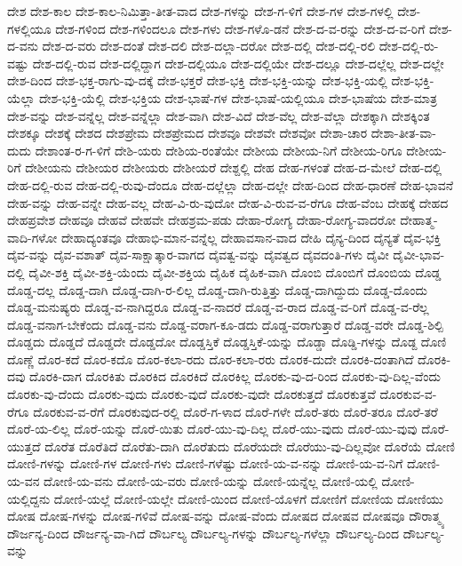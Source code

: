 {ದೇಶ
ದೇಶ-ಕಾಲ
ದೇಶ-ಕಾಲ-ನಿಮಿತ್ತಾ-ತೀತ-ವಾದ
ದೇಶ-ಗಳನ್ನು
ದೇಶ-ಗ-ಳಿಗೆ
ದೇಶ-ಗಳ
ದೇಶ-ಗಳಲ್ಲಿ
ದೇಶ-ಗಳಲ್ಲಿಯೂ
ದೇಶ-ಗಳಿಂದ
ದೇಶ-ಗಳಿಂದಲೂ
ದೇಶ-ಗಳು
ದೇಶ-ಗಳೊ-ಡನೆ
ದೇಶ-ದ-ವ-ರನ್ನು
ದೇಶ-ದ-ವ-ರಿಗೆ
ದೇಶ-ದ-ವನು
ದೇಶ-ದ-ವರು
ದೇಶ-ದಂತೆ
ದೇಶ-ದಲಿ
ದೇಶ-ದಲ್ಲಾ-ದರೋ
ದೇಶ-ದಲ್ಲಿ
ದೇಶ-ದಲ್ಲಿ-ರಲಿ
ದೇಶ-ದಲ್ಲಿ-ರು-ವಷ್ಟು
ದೇಶ-ದಲ್ಲಿ-ರುವ
ದೇಶ-ದಲ್ಲಿದ್ದಾಗ
ದೇಶ-ದಲ್ಲಿಯೂ
ದೇಶ-ದಲ್ಲಿಯೇ
ದೇಶ-ದಲ್ಲೂ
ದೇಶ-ದಲ್ಲೆಲ್ಲ
ದೇಶ-ದಲ್ಲೇ
ದೇಶ-ದಿಂದ
ದೇಶ-ಭಕ್ತ-ರಾಗು-ವು-ದಕ್ಕೆ
ದೇಶ-ಭಕ್ತರೆ
ದೇಶ-ಭಕ್ತಿ
ದೇಶ-ಭಕ್ತಿ-ಯನ್ನು
ದೇಶ-ಭಕ್ತಿ-ಯಲ್ಲಿ
ದೇಶ-ಭಕ್ತಿ-ಯೆಲ್ಲಾ
ದೇಶ-ಭಕ್ತಿ-ಯೆಲ್ಲಿ
ದೇಶ-ಭಕ್ತಿಯ
ದೇಶ-ಭಾಷೆ-ಗಳ
ದೇಶ-ಭಾಷೆ-ಯಲ್ಲಿಯೂ
ದೇಶ-ಭಾಷೆಯ
ದೇಶ-ಮಾತ್ರ
ದೇಶ-ವನ್ನು
ದೇಶ-ವನ್ನೆಲ್ಲ
ದೇಶ-ವನ್ನೆಲ್ಲಾ
ದೇಶ-ವಾಗಿ
ದೇಶ-ವಿದೆ
ದೇಶ-ವೆಲ್ಲ
ದೇಶ-ವೆಲ್ಲಾ
ದೇಶಕ್ಕಾಗಿ
ದೇಶಕ್ಕಿಂತ
ದೇಶಕ್ಕೂ
ದೇಶಕ್ಕೆ
ದೇಶದ
ದೇಶಪ್ರೇಮ
ದೇಶಪ್ರೇಮದ
ದೇಶವೂ
ದೇಶವೇ
ದೇಶವೋ
ದೇಶಾ-ಚಾರ
ದೇಶಾ-ತೀತ-ವಾ-ದುದು
ದೇಶಾಂತ-ರ-ಗ-ಳಿಗೆ
ದೇಶಿ-ಯರು
ದೇಶಿಯ-ರಂತೆಯೇ
ದೇಶೀಯ
ದೇಶೀಯ-ನಿಗೆ
ದೇಶೀಯ-ರಿಗೂ
ದೇಶೀಯ-ರಿಗೆ
ದೇಶೀಯನು
ದೇಶೀಯರ
ದೇಶೀಯರು
ದೇಶೀಯರೆ
ದೇಶ್ದಲ್ಲಿ
ದೇಹ
ದೇಹ-ಗಳಂತೆ
ದೇಹ-ದ-ಮೇಲೆ
ದೇಹ-ದಲ್ಲಿ
ದೇಹ-ದಲ್ಲಿ-ರುವ
ದೇಹ-ದಲ್ಲಿ-ರುವು-ದೆಂದೂ
ದೇಹ-ದಲ್ಲೆಲ್ಲಾ
ದೇಹ-ದಲ್ಲೇ
ದೇಹ-ದಿಂದ
ದೇಹ-ಧಾರಣೆ
ದೇಹ-ಭಾವನೆ
ದೇಹ-ವನ್ನು
ದೇಹ-ವನ್ನೇ
ದೇಹ-ವಲ್ಲ
ದೇಹ-ವಿ-ರು-ವುದೋ
ದೇಹ-ವಿ-ರುವ-ವ-ರೆಗೂ
ದೇಹ-ವೆಂಬ
ದೇಹಕ್ಕೆ
ದೇಹದ
ದೇಹಪ್ರವೇಶ
ದೇಹವೂ
ದೇಹವೆ
ದೇಹವೇ
ದೇಹಶ್ರಮ-ಪಡು
ದೇಹಾ-ರೋಗ್ಯ
ದೇಹಾ-ರೋಗ್ಯ-ವಾದರೋ
ದೇಹಾತ್ಮ-ವಾದಿ-ಗಳೋ
ದೇಹಾದ್ಯಂತವೂ
ದೇಹಾಭಿ-ಮಾನ-ವನ್ನೆಲ್ಲ
ದೇಹಾವಸಾನ-ವಾದ
ದೇಹಿ
ದೈನ್ಯ-ದಿಂದ
ದೈನ್ಯತೆ
ದೈವ-ಭಕ್ತಿ
ದೈವ-ವನ್ನು
ದೈವ-ವಶಾತ್
ದೈವ-ಸಾಕ್ಷಾತ್ಕಾರ-ವಾಗದ
ದೈವತ್ವ-ವನ್ನು
ದೈವತ್ವದ
ದೈವದಂತಿ-ಗಳು
ದೈವೀ
ದೈವೀ-ಭಾವ-ದಲ್ಲಿ
ದೈವೀ-ಶಕ್ತಿ
ದೈವೀ-ಶಕ್ತಿ-ಯೆಂದು
ದೈವೀ-ಶಕ್ತಿಯ
ದೈಹಿಕ
ದೈಹಿಕ-ವಾಗಿ
ದೊಂಬಿ
ದೊಂಬಿಗೆ
ದೊಂಬಿಯ
ದೊಡ್ಡ
ದೊಡ್ಡ-ದಲ್ಲ
ದೊಡ್ಡ-ದಾಗಿ
ದೊಡ್ಡ-ದಾಗಿ-ರ-ಲಿಲ್ಲ
ದೊಡ್ಡ-ದಾಗಿ-ರುತ್ತಿತ್ತು
ದೊಡ್ಡ-ದಾಗಿದ್ದುದು
ದೊಡ್ಡ-ದೊಂದು
ದೊಡ್ಡ-ಮನುಷ್ಯರು
ದೊಡ್ಡ-ವ-ನಾಗಿದ್ದರೂ
ದೊಡ್ಡ-ವ-ನಾದರೆ
ದೊಡ್ಡ-ವ-ರಾದ
ದೊಡ್ಡ-ವ-ರಿಗೆ
ದೊಡ್ಡ-ವ-ರೆಲ್ಲ
ದೊಡ್ಡ-ವನಾಗ-ಬೇಕೆಂದು
ದೊಡ್ಡ-ವನು
ದೊಡ್ಡ-ವರಾಗ-ಕೂ-ಡದು
ದೊಡ್ಡ-ವರಾಗುತ್ತಾರೆ
ದೊಡ್ಡ-ವರೇ
ದೊಡ್ಡ-ಶಿಲ್ಪಿ
ದೊಡ್ಡದು
ದೊಡ್ಡದೆ
ದೊಡ್ಡದೇ
ದೊಡ್ಡದೋ
ದೊಡ್ಡಸ್ತಿಕೆ
ದೊಡ್ಡಸ್ತಿಕೆ-ಯನ್ನು
ದೊಡ್ಡಾ
ದೊಡ್ಡಿ-ಗಳನ್ನು
ದೊಡ್ದ
ದೊಣಿ
ದೊಣ್ಣೆ
ದೊರ-ಕದೆ
ದೊರ-ಕದೊ
ದೊರ-ಕಲಾ-ರದು
ದೊರ-ಕಲಾ-ರರು
ದೊರಕ-ದುದೇ
ದೊರಕಿ-ದಂತಾಗಿದೆ
ದೊರಕಿ-ದವು
ದೊರಕಿ-ದಾಗ
ದೊರಕಿತು
ದೊರಕಿದ
ದೊರಕಿದೆ
ದೊರಕಿಲ್ಲ
ದೊರಕು-ವು-ದ-ರಿಂದ
ದೊರಕು-ವು-ದಿಲ್ಲ-ವೆಂದು
ದೊರಕು-ವು-ದೆಂದು
ದೊರಕು-ವುದು
ದೊರಕು-ವುದೆ
ದೊರಕು-ವುದೇ
ದೊರಕುತ್ತದೆ
ದೊರಕುತ್ತವೆ
ದೊರಕುವ-ವ-ರೆಗೂ
ದೊರಕುವ-ವ-ರೆಗೆ
ದೊರಕುವುದ-ರಲ್ಲಿ
ದೊರೆ-ಗ-ಳಾದ
ದೊರೆ-ಗಳೇ
ದೊರೆ-ತರು
ದೊರೆ-ತರೂ
ದೊರೆ-ತರೆ
ದೊರೆ-ಯ-ಲಿಲ್ಲ
ದೊರೆ-ಯನ್ನು
ದೊರೆ-ಯಿತು
ದೊರೆ-ಯು-ವು-ದಿಲ್ಲ
ದೊರೆ-ಯು-ವುದು
ದೊರೆ-ಯು-ವುವು
ದೊರೆ-ಯುತ್ತದೆ
ದೊರೆತ
ದೊರೆತಿದೆ
ದೊರೆತು-ದಾಗಿ
ದೊರೆತುದು
ದೊರೆಯದೇ
ದೊರೆಯು-ವು-ದಿಲ್ಲವೋ
ದೊರೆಯೆ
ದೋಣಿ
ದೋಣಿ-ಗಳನ್ನು
ದೋಣಿ-ಗಳ
ದೋಣಿ-ಗಳು
ದೋಣಿ-ಗಳೆಷ್ಟು
ದೋಣಿ-ಯ-ವ-ನನ್ನು
ದೋಣಿ-ಯ-ವ-ನಿಗೆ
ದೋಣಿ-ಯ-ವನ
ದೋಣಿ-ಯ-ವನು
ದೋಣಿ-ಯ-ವರು
ದೋಣಿ-ಯನ್ನು
ದೋಣಿ-ಯನ್ನೆಲ್ಲ
ದೋಣಿ-ಯಲ್ಲಿ
ದೋಣಿ-ಯಲ್ಲಿದ್ದನು
ದೋಣಿ-ಯಲ್ಲೆ
ದೋಣಿ-ಯಲ್ಲೇ
ದೋಣಿ-ಯಿಂದ
ದೋಣಿ-ಯೊಳಗೆ
ದೋಣಿಗೆ
ದೋಣಿಯ
ದೋಣಿಯು
ದೋಷ
ದೋಷ-ಗಳನ್ನು
ದೋಷ-ಗಳಿವೆ
ದೋಷ-ವನ್ನು
ದೋಷ-ವೆಂದು
ದೋಷದ
ದೋಷವ
ದೋಷವೂ
ದೌರಾತ್ಮ್ಯ
ದೌರ್ಜನ್ಯ-ದಿಂದ
ದೌರ್ಜನ್ಯ-ವಾ-ಗಿದೆ
ದೌರ್ಬಲ್ಯ
ದೌರ್ಬಲ್ಯ-ಗಳನ್ನು
ದೌರ್ಬಲ್ಯ-ಗಳೆಲ್ಲಾ
ದೌರ್ಬಲ್ಯ-ದಿಂದ
ದೌರ್ಬಲ್ಯ-ವನ್ನು
}
